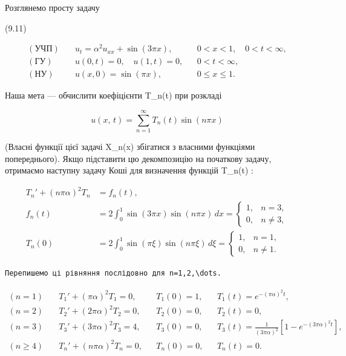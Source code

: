 \documentclass[
  ukrainian,
]{article}
\begin{document}
Розглянемо просту задачу

(9.11)

\[
\begin{aligned}
(\text{УЧП})\quad & u_t = \alpha^2 u_{xx} + \sin(3\pi x), && 0 < x < 1,\quad 0 < t < \infty, \\
(\text{ГУ})\quad & u(0,t)=0,\quad u(1,t)=0, && 0 < t < \infty, \\
(\text{НУ})\quad & u(x,0)=\sin(\pi x), && 0 \le x \le 1.
\end{aligned}
\]

Наша мета --- обчислити коефіцієнти T\_n(t) при розкладі

\[
u\left(x,\,t\right)=\sum_{n=1}^{\infty}T_n(t)\sin(n\pi x)
\]

(Власні функції цієї задачі X\_n(x) збігатися з власними функціями
попереднього). Якщо підставити цю декомпозицію на початкову задачу,
отримаємо наступну задачу Коші для визначення функцій T\_n(t) :

\[
\begin{aligned}
T_n' + (n\pi\alpha)^2 T_n &= f_n(t), \\
f_n(t) &= 2 \int_0^1 \sin(3\pi x)\sin(n\pi x)\,dx
= \begin{cases}
1, & n = 3, \\
0, & n \ne 3,
\end{cases} \\
T_n(0) &= 2 \int_0^1 \sin(\pi \xi)\sin(n\pi \xi)\,d\xi
= \begin{cases}
1, & n = 1, \\
0, & n \ne 1.
\end{cases}
\end{aligned}
\]

\begin{verbatim}
Перепишемо ці рівняння послідовно для n=1,2,\dots.
\end{verbatim}

\[
\begin{aligned}
(n=1)\quad & T_1' + (\pi\alpha)^2 T_1 = 0, && T_1(0) = 1, && T_1(t) = e^{-(\pi\alpha)^2 t}, \\
(n=2)\quad & T_2' + (2\pi\alpha)^2 T_2 = 0, && T_2(0) = 0, && T_2(t) = 0, \\
(n=3)\quad & T_3' + (3\pi\alpha)^2 T_3 = 4, && T_3(0) = 0, && T_3(t) = \frac{1}{(3\pi\alpha)^2}\left[1 - e^{-(3\pi\alpha)^2 t}\right], \\
(n\geqslant 4)\quad & T_n' + (n\pi\alpha)^2 T_n = 0, && T_n(0) = 0, && T_n(t) = 0.
\end{aligned}
\]
\end{document}
